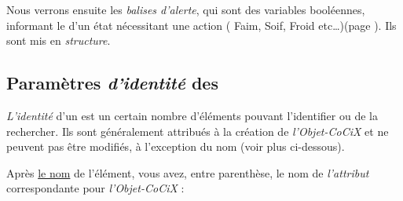 \documentclass[french]{report}
\begin{document}
Nous verrons ensuite les \textit{balises d'alerte}, qui sont des variables booléennes, informant  le \CoCiX d'un état nécessitant une action ( Faim, Soif, Froid etc\dots)(page \pageref{balise}). Ils sont mis en \textit{structure}.

\newpage

\subsection{Paramètres \textit{d'identité} des \CoCiX}\label{identite}

\textit{L'identité} d'un \CoCiX est un certain nombre d'éléments pouvant l'identifier ou de la rechercher. Ils sont généralement attribués à la création de \textit{l'Objet-CoCiX} et ne peuvent pas être modifiés, à l'exception du nom (voir plus ci-dessous).\par

Après \underline{le nom} de l'élément, vous avez, entre parenthèse, le nom de \textit{l'attribut} correspondante pour \textit{l'Objet-CoCiX} :\\
\end{document}
